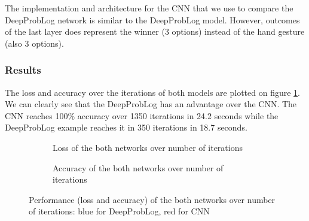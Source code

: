     The implementation and architecture for the CNN that we use to compare the DeepProbLog network is similar to the DeepProbLog model. However, outcomes of the last layer does represent the winner (3 options) instead of the hand gesture (also 3 options).


\subsubsection{Results}
The loss and accuracy over the iterations of both models are plotted on figure \ref{fig:rps_output}. We can clearly see that the DeepProbLog has an advantage over the CNN. The CNN reaches 100\% accuracy over 1350 iterations in 24.2 seconds while the DeepProbLog example reaches it in 350 iterations in 18.7 seconds. 


\begin{figure}[h]
    \centering
    \begin{subfigure}[b]{0.49\textwidth}
        \caption{Loss of the both networks over number of iterations}
    \end{subfigure}
    \hfill
    \begin{subfigure}[b]{0.49\textwidth}
        \caption{Accuracy of the both networks over number of iterations}
    \end{subfigure}
    \caption{Performance (loss and accuracy) of the both networks over number of iterations: blue for DeepProbLog, red for CNN}
    \label{fig:rps_output}
\end{figure}  
